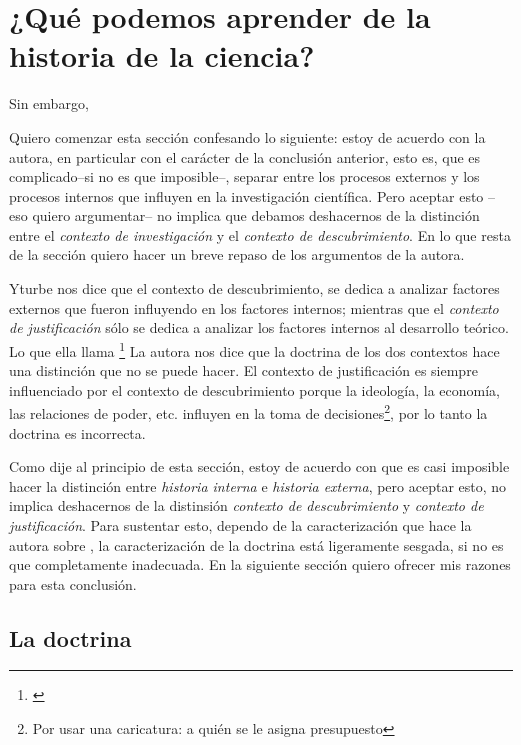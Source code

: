 \section{¿Qué podemos aprender de la historia de la ciencia?}

\noindent Sin embargo,

\noindent Quiero comenzar esta sección confesando lo siguiente: estoy de acuerdo con la autora, en particular con el carácter de la conclusión anterior, esto es, que es complicado--si no es que imposible--, separar entre los procesos externos y los procesos internos que influyen en la investigación científica.
Pero aceptar esto --eso quiero argumentar-- no implica que debamos deshacernos de la distinción entre el \emph{contexto de investigación} y el \emph{contexto de descubrimiento}.
En lo que resta de la sección quiero hacer un breve repaso de los argumentos de la autora.

Yturbe nos dice que el contexto de descubrimiento, se dedica a analizar factores externos que fueron influyendo en los factores internos; mientras que el \emph{contexto de justificación} sólo se dedica a analizar los factores internos al desarrollo teórico.
Lo que ella llama \footnote{
	 \cite[][p. 75]{Yturbe1995}
}
La autora nos dice que la doctrina de los dos contextos hace una distinción que no se puede hacer.
El contexto de justificación es siempre influenciado por el contexto de descubrimiento porque la ideología, la economía, las relaciones de poder, etc. influyen en la toma de decisiones\footnote{Por usar una caricatura: a quién se le asigna presupuesto}, por lo tanto la doctrina es incorrecta.

Como dije al principio de esta sección, estoy de acuerdo con que es casi imposible hacer la distinción entre \emph{historia interna} e \emph{historia externa}, pero aceptar esto, no implica deshacernos de la distinsión \emph{contexto de descubrimiento} y \emph{contexto de justificación}.
Para sustentar esto, dependo de la caracterización que hace la autora sobre , la caracterización de la doctrina está ligeramente sesgada, si no es que completamente inadecuada.
En la siguiente sección quiero ofrecer mis razones para esta conclusión.

\subsection{La doctrina}

